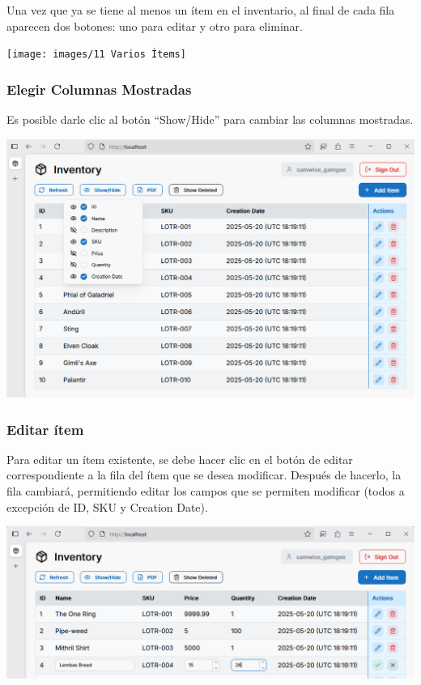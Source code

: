 Una vez que ya se tiene al menos un ítem en el inventario, al final de cada fila aparecen dos botones: uno para editar y otro para eliminar.

\texttt{[image: images/11 Varios Ítems]}

\subsubsection{Elegir Columnas Mostradas}

Es posible darle clic al botón “Show/Hide” para cambiar las columnas mostradas.

\includegraphics[width=\textwidth]{images/12 Campos Mostrados}

\subsubsection{Editar ítem}

Para editar un ítem existente, se debe hacer clic en el botón de editar correspondiente a la fila del ítem que se desea modificar. Después de hacerlo, la fila cambiará, permitiendo editar los campos que se permiten modificar (todos a excepción de ID, SKU y Creation Date).

\includegraphics[width=\textwidth]{images/13 Editar}

